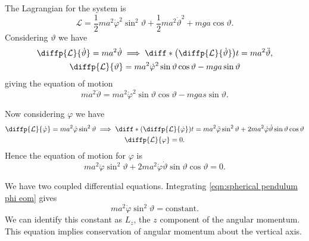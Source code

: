 \documentclass[fleqn]{NotesClass}
\newcommand*{\lagrangian}{\mathcal{L}}
\begin{document}
    The Lagrangian for the system is
    \begin{equation}
        \lagrangian = \frac{1}{2}ma^2\dot{\varphi}^2\sin^2\vartheta + \frac{1}{2}ma^2\dot{\vartheta}^2 + mga\cos\vartheta.
    \end{equation}
    Considering \(\vartheta\) we have
    \begin{gather}
        \diffp{\lagrangian}{\dot{\vartheta}} = ma^2\dot{\vartheta} \implies \diff*{\left( \diffp{\lagrangian}{\dot{\vartheta}} \right)}{t} = ma^2\ddot{\vartheta},\\
        \diffp{\lagrangian}{\vartheta} = ma^2\dot{\varphi}^2\sin\vartheta\cos\vartheta - mga\sin\vartheta
    \end{gather}
    giving the equation of motion
    \begin{equation}\label{eqn:spheirical pendulum theta eom}
        ma^2\ddot{\vartheta} = ma^2\dot{\varphi}^2\sin\vartheta\cos\vartheta - mgas\sin\vartheta.
    \end{equation}
    
    Now considering \(\varphi\) we have
    \begin{gather}
        \diffp{\lagrangian}{\dot{\varphi}} = ma^2\dot\varphi\sin^2\vartheta \implies \diff*{\left( \diffp{\lagrangian}{\dot{\varphi}} \right)}{t} = ma^2\ddot{\varphi}\sin^2\vartheta +2ma^2\dot{\varphi}\dot{\vartheta}\sin\vartheta\cos\vartheta\\
        \diffp{\lagrangian}{\varphi} = 0.
    \end{gather}
    Hence the equation of motion for \(\varphi\) is
    \begin{equation}\label{eqn:spherical pendulum phi eom}
        ma^2\ddot{\varphi}\sin^2\vartheta +2ma^2\dot{\varphi}\dot{\vartheta}\sin\vartheta\cos\vartheta = 0.
    \end{equation}
    
    We have two coupled differential equations.
    Integrating \cref{eqn:spherical pendulum phi eom} gives
    \begin{equation}
        ma^2\dot{\varphi}\sin^2\vartheta = \text{constant}.
    \end{equation}
    We can identify this constant as \(L_z\), the \(z\) component of the angular momentum.
    This equation implies conservation of angular momentum about the vertical axis.
    
\end{document}
